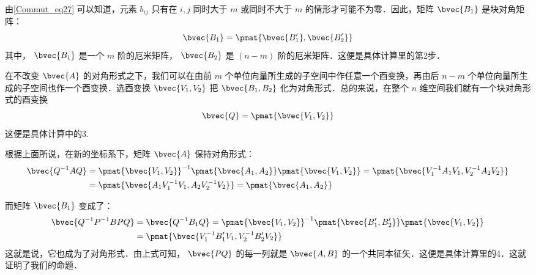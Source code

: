 由\autoref{Commut_eq27} 可以知道，元素 $b_{ij}$ 只有在 $i,j$ 同时大于 $m$ 或同时不大于 $m$ 的情形才可能不为零．因此，矩阵 $\bvec{B_1}$ 是块对角矩阵：
\begin{equation}
\bvec{B_1}=\pmat{\bvec{B'_1},\bvec{B'_2}}
\end{equation}
其中， $\bvec{B_1}$ 是一个 $m$ 阶的厄米矩阵， $\bvec{B_2}$ 是 $(n-m)$ 阶的厄米矩阵．这便是具体计算里的第2步．

在不改变 $\bvec{A}$ 的对角形式之下，我们可以在由前 $m$ 个单位向量所生成的子空间中作任意一个酉变换，再由后 $n-m$ 个单位向量所生成的子空间也作一个酉变换．选酉变换 $\bvec{V_1,V_2}$ 把 $\bvec{B_1,B_2}$ 化为对角形式．总的来说，在整个 $n$ 维空间我们就有一个块对角形式的酉变换
\begin{equation}
\bvec{Q}=\pmat{\bvec{V_1,V_2}}
\end{equation}
这便是具体计算中的3.

根据上面所说，在新的坐标系下，矩阵 $\bvec{A}$ 保持对角形式：
\begin{equation}
\begin{aligned}
\bvec{Q^{-1}AQ}&=\pmat{\bvec{V_1,V_2}}^{-1}\pmat{\bvec{A_1,A_2}}\pmat{\bvec{V_1,V_2}}=\pmat{\bvec{V_1^{-1}A_1V_1,V_2^{-1}A_2V_2}}\\
&=\pmat{\bvec{A_1V_1^{-1}V_1,A_2V_2^{-1}V_2}}=\pmat{\bvec{A_1,A_2}}
\end{aligned}
\end{equation}

而矩阵 $\bvec{B_1}$ 变成了：
\begin{equation}
\begin{aligned}
\bvec{Q^{-1}P^{-1}BPQ}&=\bvec{Q^{-1}B_1Q}=\pmat{\bvec{V_1,V_2}}^{-1}\pmat{\bvec{B'_1,B'_2}}\pmat{\bvec{V_1,V_2}}\\
&=\pmat{\bvec{V_1^{-1}B'_1V_1,V_2^{-1}B'_2V_2}}\\
\end{aligned}
\end{equation}
这就是说，它也成为了对角形式．由上式可知， $\bvec{PQ}$ 的每一列就是 $\bvec{A,B}$ 的一个共同本征矢．这便是具体计算里的4．这就证明了我们的命题．


